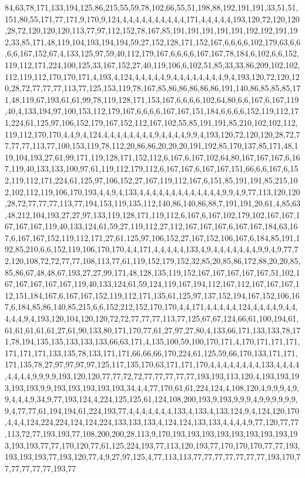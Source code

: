84,63,78,171,133,194,125,86,215,55,59,78,102,66,55,51,198,88,192,191,191,33,51,51,151,80,55,171,77,171,9,170,9,124,4,4,4,4,4,4,4,4,4,4,171,4,4,4,4,4,193,120,72,120,120,28,72,120,120,120,113,77,97,112,152,78,167,85,191,191,191,191,191,192,192,191,192,33,85,171,48,119,104,193,194,194,59,27,152,128,171,152,167,6,6,6,6,102,179,63,6,6,6,6,167,152,67,4,133,125,97,59,40,112,179,167,6,6,6,6,167,167,78,184,6,102,6,6,152,119,112,171,224,100,125,33,167,152,27,40,119,106,6,102,51,85,33,33,86,209,102,102,112,119,112,170,170,171,4,193,4,124,4,4,4,4,4,9,4,4,4,4,4,4,4,4,9,4,193,120,72,120,120,28,72,77,77,77,113,77,125,153,119,78,167,85,86,86,86,86,86,191,140,86,85,85,85,171,48,119,67,193,61,61,99,78,119,128,171,153,167,6,6,6,6,102,64,80,6,6,167,6,167,119,40,4,133,194,97,100,153,112,179,167,6,6,6,6,167,167,151,184,6,6,6,6,152,119,112,171,224,61,125,97,106,152,179,167,152,112,167,102,55,85,191,191,85,210,102,102,112,119,112,170,170,4,4,9,4,124,4,4,4,4,4,4,4,4,9,4,4,4,4,9,9,4,193,120,72,120,120,28,72,77,77,77,113,77,100,153,119,78,112,20,86,86,20,20,20,191,192,85,170,137,85,171,48,119,104,193,27,61,99,171,119,128,171,152,112,6,167,6,167,102,64,80,167,167,167,6,167,119,40,133,133,100,97,61,119,112,179,112,6,167,167,6,167,167,151,66,6,6,167,6,152,119,112,171,224,61,125,97,106,152,27,167,119,112,167,6,151,85,191,191,85,215,102,102,112,119,106,170,193,4,4,9,4,133,4,4,4,4,4,4,4,4,4,4,4,4,4,9,9,4,9,77,113,120,120,28,72,77,77,77,113,77,194,153,119,135,112,140,86,140,86,88,7,191,191,20,61,4,85,63,48,212,104,193,27,27,97,133,119,128,171,119,112,6,167,6,167,102,179,102,167,167,167,167,167,119,40,133,124,61,59,27,119,112,27,112,167,167,167,6,167,167,184,63,167,6,167,167,152,119,112,171,27,61,125,97,106,152,27,167,152,106,167,6,184,85,191,192,85,210,6,6,152,119,106,170,170,4,4,171,4,4,4,4,4,133,4,9,4,4,4,4,4,4,4,9,9,4,9,77,72,120,108,72,72,77,77,108,113,77,61,119,152,179,152,32,85,20,85,86,172,88,20,20,85,85,86,67,48,48,67,193,27,27,99,171,48,128,135,119,152,167,167,167,167,167,51,102,167,167,167,167,167,119,40,133,124,61,59,124,119,167,194,112,167,112,167,167,167,112,151,184,167,6,167,167,152,119,112,171,135,61,125,97,137,152,194,167,152,106,167,6,184,85,86,140,85,215,6,6,152,212,152,170,170,4,4,171,4,4,4,4,4,124,4,4,4,4,9,4,4,4,4,4,9,4,193,120,104,120,120,72,72,77,77,77,113,77,125,67,67,124,66,61,100,194,61,61,61,61,61,61,27,61,90,133,80,171,170,77,61,27,97,27,80,4,133,66,171,133,133,78,171,78,194,135,135,133,133,133,66,63,171,4,135,100,59,100,170,171,4,170,171,171,171,171,171,171,133,135,78,133,171,171,66,66,66,170,224,61,125,59,66,170,133,171,171,171,135,78,27,97,97,97,97,125,117,135,170,63,171,171,170,4,4,4,4,4,4,4,4,133,4,4,4,4,4,4,4,4,9,9,9,9,193,120,120,77,77,72,72,77,77,77,77,77,193,193,113,120,4,193,193,193,193,193,9,9,193,193,193,193,193,34,4,4,77,170,61,61,224,124,4,108,120,4,9,9,9,4,9,9,4,4,4,9,34,9,77,193,124,4,224,125,125,61,124,108,200,193,9,193,9,9,9,4,9,9,9,9,9,9,9,4,77,77,61,194,194,61,224,193,77,4,4,4,4,4,4,4,133,4,133,4,133,124,9,4,124,120,170,4,4,4,124,224,224,124,124,224,133,133,133,4,124,124,133,133,4,4,4,4,9,77,120,77,77,113,72,77,193,193,77,108,200,200,28,113,9,170,193,193,193,193,193,193,193,193,193,193,193,77,77,170,120,77,61,125,224,193,77,113,120,193,77,170,170,170,77,77,193,193,193,193,77,193,120,77,4,9,27,97,125,4,77,113,113,77,77,77,77,77,77,77,193,170,77,77,77,77,77,193,77